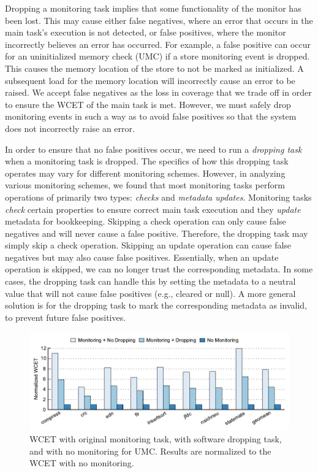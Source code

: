 Dropping a monitoring task implies that some functionality of the monitor has
been lost.  This may cause either false negatives, where an error that occurs
in the main task's execution is not detected, or false positives, where the
monitor incorrectly believes an error has occurred.  For example, a false
positive can occur for an uninitialized memory check (UMC) if a store monitoring event is dropped. This causes
the memory location of the store to not be marked as initialized. A subsequent
load for the memory location will incorrectly cause an error to be raised.  We
accept false negatives as the loss in coverage that we trade off in order to
ensure the WCET of the main task is met. However, we must safely drop
monitoring events in such a way as to avoid false positives so that the system
does not incorrectly raise an error.

In order to ensure that no false positives occur, we need to run a
\emph{dropping task} when a monitoring task is dropped.  The specifics of how
this dropping task operates may vary for different monitoring schemes. However,
in analyzing various monitoring schemes, we found that most monitoring tasks
perform operations of primarily two types: \emph{checks} and \emph{metadata
updates}. Monitoring tasks \emph{check} certain properties to ensure correct
main task execution and they \emph{update} metadata for bookkeeping. Skipping a
check operation can only cause false negatives and will never cause a false
positive. Therefore, the dropping task may simply skip a check operation.
Skipping an update operation can cause false negatives but may also cause false
positives.  Essentially, when an update operation is skipped, we can no longer
trust the corresponding metadata. In some cases, the dropping task can handle
this by setting the metadata to a neutral value that will not cause false
positives (e.g., cleared or null). A more general solution is for the dropping
task to mark the corresponding metadata as invalid, to prevent future false
positives.

\begin{figure}
  \begin{center}
    \includegraphics{monitoring_hard_drop/data/sw_drop_wcet.pdf}
    \caption{WCET with original monitoring task, with software dropping task,
    and with no monitoring for UMC. Results are normalized to the WCET with no
    monitoring.}
    \label{fig:monitoring_hard_drop.drop.sw_drop_wcet} 
  \end{center}
\end{figure}

